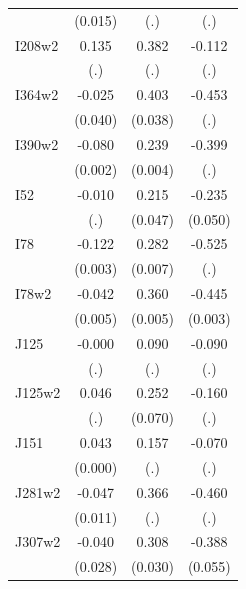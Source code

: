 \begin{table}[htbp]
\begin{tabular}{l*{3}{c}}
                &  (0.015)         &      (.)         &      (.)         \\
I208w2          &    0.135         &    0.382         &   -0.112         \\
                &      (.)         &      (.)         &      (.)         \\
I364w2          &   -0.025         &    0.403\sym{***}&   -0.453         \\
                &  (0.040)         &  (0.038)         &      (.)         \\
I390w2          &   -0.080\sym{***}&    0.239\sym{***}&   -0.399         \\
                &  (0.002)         &  (0.004)         &      (.)         \\
I52             &   -0.010         &    0.215\sym{***}&   -0.235\sym{***}\\
                &      (.)         &  (0.047)         &  (0.050)         \\
I78             &   -0.122\sym{***}&    0.282\sym{***}&   -0.525         \\
                &  (0.003)         &  (0.007)         &      (.)         \\
I78w2           &   -0.042\sym{***}&    0.360\sym{***}&   -0.445\sym{***}\\
                &  (0.005)         &  (0.005)         &  (0.003)         \\
J125            &   -0.000         &    0.090         &   -0.090         \\
                &      (.)         &      (.)         &      (.)         \\
J125w2          &    0.046         &    0.252\sym{***}&   -0.160         \\
                &      (.)         &  (0.070)         &      (.)         \\
J151            &    0.043\sym{***}&    0.157         &   -0.070         \\
                &  (0.000)         &      (.)         &      (.)         \\
J281w2          &   -0.047\sym{***}&    0.366         &   -0.460         \\
                &  (0.011)         &      (.)         &      (.)         \\
J307w2          &   -0.040         &    0.308\sym{***}&   -0.388\sym{***}\\
                &  (0.028)         &  (0.030)         &  (0.055)         \\

\end{tabular}
\end{table}
